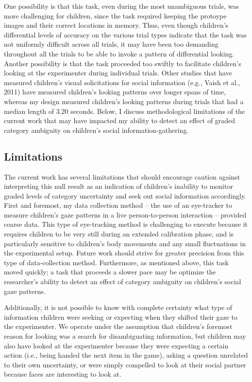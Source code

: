 \documentclass[floatsintext,man]{apa6}
\theoremstyle{definition}
\theoremstyle{definition}
\theoremstyle{definition}
\theoremstyle{remark}
\begin{document}
One possibility is that this task, even during the most unambiguous
trials, was more challenging for children, since the task required
keeping the protoype images and their correct locations in memory. Thus,
even though children's differential levels of accuracy on the various
trial types indicate that the task was not uniformly difficult across
all trials, it may have been too demanding throughout all the trials to
be able to invoke a pattern of differential looking. Another possibility
is that the task proceeded too swiftly to facilitate children's looking
at the experimenter during individual trials. Other studies that have
measured children's visual solicitations for social information (e.g.,
Vaish et al., 2011) have measured children's looking patterns over
longer spans of time, whereas my design measured children's looking
patterns during trials that had a median length of 3.20 seconds. Below,
I discuss methodological limitations of the current work that may have
impacted my ability to detect an effect of graded category ambiguity on
children's social information-gathering.

\subsection{Limitations}\label{limitations}

The current work has several limitations that should encourage caution
against interpreting this null result as an indication of children's
inability to monitor graded levels of category uncertainty and seek out
social information accordingly. First and foremost, my data collection
method -- the use of an eye-tracker to measure children's gaze patterns
in a live person-to-person interaction -- provided coarse data. This
type of eye-tracking method is challenging to execute because it
requires children to be very still during an extended calibration phase,
and is particularly sensitive to children's body movements and any small
fluctuations in the experimental setup. Future work should strive for
greater precision from this type of data-collection method. Furthermore,
as mentioned above, this task moved quickly; a task that proceeds a
slower pace may be optimize the researcher's ability to detect an effect
of category ambiguity on children's social gaze patterns.

Additionally, it is not possible to know with complete certainty what
type of information children were seeking or expecting when they shifted
their gaze to the experimenter. We operate under the assumption that
children's foremost reason for looking was a search for disambiguating
information, but children may also have looked at the experimenter
because they were expecting a certain action (i.e., being handed the
next item in the game), asking a question unrelated to their own
uncertainty, or were simply compelled to look at their social partner
because faces are interesting to look at.
\end{document}
